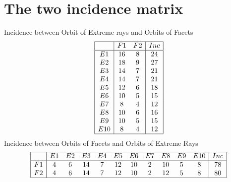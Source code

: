 \documentclass[12pt]{article}
\begin{document}
\section{The two incidence matrix}
Incidence between Orbit of Extreme rays and Orbits of Facets
\begin{equation*}
\begin{array}{|c|cc|c|}
\hline
&F1&F2&Inc\\
\hline
E1&16&8&24\\
E2&18&9&27\\
E3&14&7&21\\
E4&14&7&21\\
E5&12&6&18\\
E6&10&5&15\\
E7&8&4&12\\
E8&10&6&16\\
E9&10&5&15\\
E10&8&4&12\\
\hline
\end{array}
\end{equation*}
Incidence between Orbits of Facets and Orbits of Extreme Rays
\begin{equation*}
\begin{array}{|c|cccccccccc|c|}
\hline
&E1&E2&E3&E4&E5&E6&E7&E8&E9&E10&Inc\\
\hline
F1&4&6&14&7&12&10&2&10&5&8&78\\
F2&4&6&14&7&12&10&2&12&5&8&80\\
\hline
\end{array}
\end{equation*}
\end{document}
